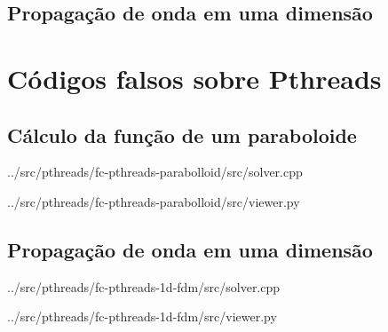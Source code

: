 \section{Propagação de onda em uma dimensão}
	
\chapter{Códigos falsos sobre Pthreads}
\section{Cálculo da função de um paraboloide}
     
     {../src/pthreads/fc-pthreads-parabolloid/src/solver.cpp}
     
     
     {../src/pthreads/fc-pthreads-parabolloid/src/viewer.py}

\section{Propagação de onda em uma dimensão}
     
     {../src/pthreads/fc-pthreads-1d-fdm/src/solver.cpp}
     
     
     {../src/pthreads/fc-pthreads-1d-fdm/src/viewer.py}

